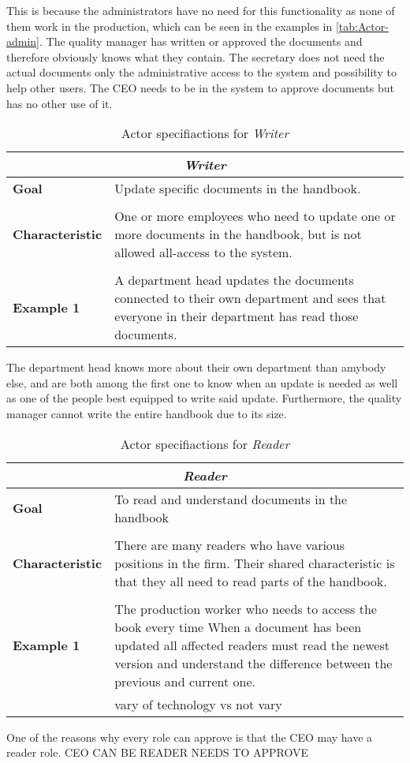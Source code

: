 This is because the administrators have no need for this functionality as none of them work in the production, which can be seen in the examples in \cref{tab:Actor-admin}.
The quality manager has written or approved the documents and therefore obviously knows what they contain.
The secretary does not need the actual documents only the administrative access to the system and possibility to help other users.
The CEO needs to be in the system to approve documents but has no other use of it.

\begin{table}[H]
	\begin{tabular}{l m{11.3cm}}
		\hline
		\multicolumn{2}{c}{\textbf{\textit{Writer}}}\\
		\hline
		\textbf{Goal} & Update specific documents in the handbook. \\
	 	 &  \\
		\textbf{Characteristic} &  One or more employees who need to update one or more documents in the handbook, but is not allowed all-access to the system. \\
		 &  \\
		\textbf{Example 1} 
		& A department head updates the documents connected to their own department and sees that everyone in their department has read those documents.\\
		\hline
	\end{tabular}
	\caption{Actor specifiactions for \textit{Writer}}\label{tab:Actor-write}
\end{table}

The department head knows more about their own department than amybody else, and are both among the first one to know when an update is needed as well as one of the people best equipped to write said update.
Furthermore, the quality manager cannot write the entire handbook due to its size.

\begin{table}[H]
	\begin{tabular}{l m{11.3cm}}
		\hline
		\multicolumn{2}{c}{\textbf{\textit{Reader}}}\\
		\hline
		\textbf{Goal} & To read and understand documents in the handbook \\
		 &  \\
		\textbf{Characteristic} & There are many readers who have various positions in the firm. Their shared characteristic is that they all need to read parts of the handbook. \\
		 &  \\
		\textbf{Example 1}
		& The production worker who needs to access the book every time 
		When a document has been updated all affected readers must read the newest version and understand the difference between the previous and current one. \\
		& vary of technology vs not vary\\
		\hline
	\end{tabular}
	\caption{Actor specifiactions for \textit{Reader}}\label{tab:Actor-read}
\end{table}

One of the reasons why every role can approve is that the CEO may have a reader role. 
CEO CAN BE READER NEEDS TO APPROVE